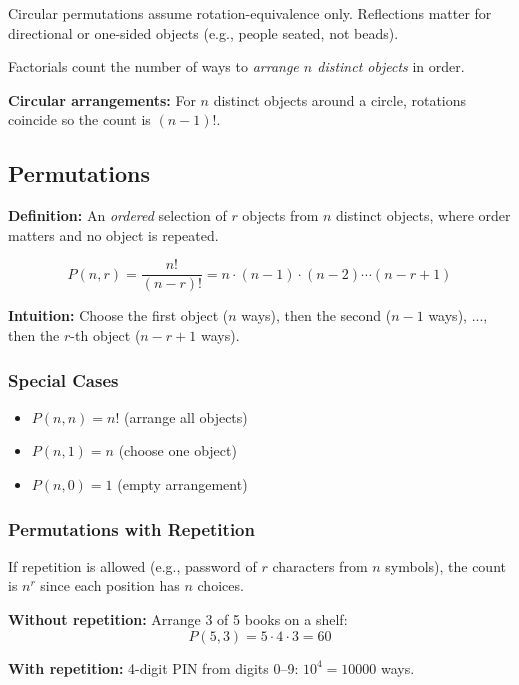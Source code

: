 \documentclass[12pt]{extarticle}
\begin{document}
\begin{remarkbox}
Circular permutations assume rotation-equivalence only. Reflections matter for directional or one-sided objects (e.g., people seated, not beads).
\end{remarkbox}
Factorials count the number of ways to \textit{arrange $n$ distinct objects} in order.

\textbf{Circular arrangements:} For $n$ distinct objects around a circle, rotations coincide so the count is $(n-1)!$.

\subsection{Permutations}
\textbf{Definition:} An \textit{ordered} selection of $r$ objects from $n$ distinct objects, where order matters and no object is repeated.

\[
P(n, r) = \frac{n!}{(n-r)!} = n \cdot (n-1) \cdot (n-2) \cdots (n-r+1)
\]

\textbf{Intuition:} Choose the first object ($n$ ways), then the second ($n-1$ ways), ..., then the $r$-th object ($n-r+1$ ways).

\subsubsection{Special Cases}

\begin{itemize}
    \item $P(n, n) = n!$ (arrange all objects)
    \item $P(n, 1) = n$ (choose one object)
    \item $P(n, 0) = 1$ (empty arrangement)
\end{itemize}

\subsubsection{Permutations with Repetition}

If repetition is allowed (e.g., password of $r$ characters from $n$ symbols), the count is $n^r$ since each position has $n$ choices.

\begin{examplebox}
\textbf{Without repetition:} Arrange 3 of 5 books on a shelf:
\[
P(5,3) = 5 \cdot 4 \cdot 3 = 60
\]
\end{examplebox}

\begin{examplebox}
\textbf{With repetition:} 4-digit PIN from digits 0--9: $10^4 = 10000$ ways.
\end{examplebox}
\end{document}

